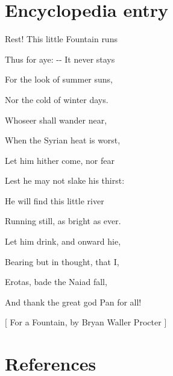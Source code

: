 \section{Encyclopedia entry}
\label{21}

Rest! This little Fountain runs$\text{ }$\newline{}

Thus for aye: -{}-{} It never stays$\text{ }$\newline{}

For the look of summer suns,$\text{ }$\newline{}

Nor the cold of winter days.$\text{ }$\newline{}

Whose\textquotesingle{}er shall wander near,$\text{ }$\newline{}

When the Syrian heat is worst,$\text{ }$\newline{}

Let him hither come, nor fear$\text{ }$\newline{}

Lest he may not slake his thirst:$\text{ }$\newline{}

He will find this little river$\text{ }$\newline{}

Running still, as bright as ever.$\text{ }$\newline{}

Let him drink, and onward hie,$\text{ }$\newline{}

Bearing but in thought, that I,$\text{ }$\newline{}

Erotas, bade the Naiad fall,$\text{ }$\newline{}

And thank the great god Pan for all!$\text{ }$\newline{}




{$\text{[}$} For a Fountain, by Bryan Waller Procter {$\text{]}$} 

\section{References}
\label{22}

